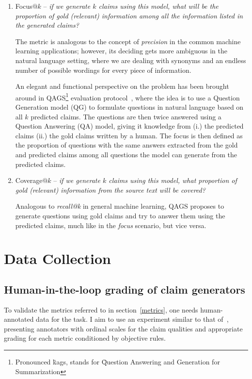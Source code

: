 \begin{enumerate}
    \item {\techbf Focus}$@k$ -- \textit{if we generate $k$ claims using this model, what will be the proportion of gold (relevant) information among all the information listed in the generated claims?}
    
    The metric is analogous to the concept of \textit{precision} in the common machine learning applications; however, its deciding gets more ambiguous in the natural language setting, where we are dealing with synonyms and an endless number of possible wordings for every piece of information.

    An elegant and functional perspective on the problem has been brought around in QAGS\footnote{Pronounced \"{kags}, stands for \"{Question Answering and Generation for Summarization}} evaluation protocol~\cite{wang-etal-2020-asking}, where the idea is to use a Question Generation model (QG) to formulate questions in natural language based on all $k$ predicted claims. The questions are then twice answered using a Question Answering (QA) model, giving it knowledge from (i.) the predicted claims (ii.) the gold claims written by a human.
    The focus is then defined as the proportion of questions with the same answers extracted from the gold and predicted claims among all questions the model can generate from the predicted claims. 

    \item {\techbf Coverage}$@k$ -- \textit{if we generate $k$ claims using this model, what proportion of gold (relevant) information from the source text will be covered?}
    
    Analogous to \textit{recall@k} in general machine learning, QAGS proposes to generate questions using gold claims and try to answer them using the predicted claims, much like in the \textit{focus} scenario, but vice versa.
\end{enumerate}

\section{Data Collection}
\subsection{Human-in-the-loop grading of claim generators}
To validate the metrics referred to in section~\ref{metrics}, one needs human-annotated data for the task.
I aim to use an experiment similar to that of~\cite{wright}, presenting annotators with ordinal scales for the claim qualities and appropriate grading for each metric conditioned by objective rules.

